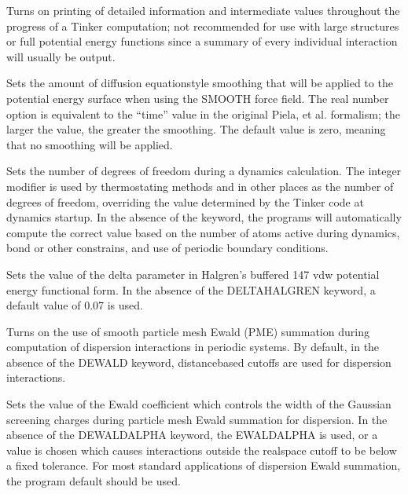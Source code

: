 \documentclass[letterpaper,11pt,english]{sphinxmanual}
\begin{document}

  Turns on printing of detailed information and intermediate values throughout the progress of a Tinker computation; not recommended for use with large structures or full potential energy functions since a summary of every individual interaction will usually be output.

  Sets the amount of diffusion equation\sphinxhyphen{}style smoothing that will be applied to the potential energy surface when using the SMOOTH force field. The real number option is equivalent to the “time” value in the original Piela, et al. formalism; the larger the value, the greater the smoothing. The default value is zero, meaning that no smoothing will be applied.

  Sets the number of degrees of freedom during a dynamics calculation. The integer modifier is used by thermostating methods and in other places as the number of degrees of freedom, overriding the value determined by the Tinker code at dynamics startup. In the absence of the keyword, the programs will automatically compute the correct value based on the number of atoms active during dynamics, bond or other constrains, and use of periodic boundary conditions.

  Sets the value of the delta parameter in Halgren’s buffered 14\sphinxhyphen{}7 vdw potential energy functional form. In the absence of the DELTA\sphinxhyphen{}HALGREN keyword, a default value of 0.07 is used.

  Turns on the use of smooth particle mesh Ewald (PME) summation during computation of dispersion interactions in periodic systems. By default, in the absence of the DEWALD keyword, distance\sphinxhyphen{}based cutoffs are used for dispersion interactions.

  Sets the value of the Ewald coefficient which controls the width of the Gaussian screening charges during particle mesh Ewald summation for dispersion. In the absence of the DEWALD\sphinxhyphen{}ALPHA keyword, the EWALD\sphinxhyphen{}ALPHA is used, or a value is chosen which causes interactions outside the real\sphinxhyphen{}space cutoff to be below a fixed tolerance. For most standard applications of dispersion Ewald summation, the program default should be used.
\end{document}
